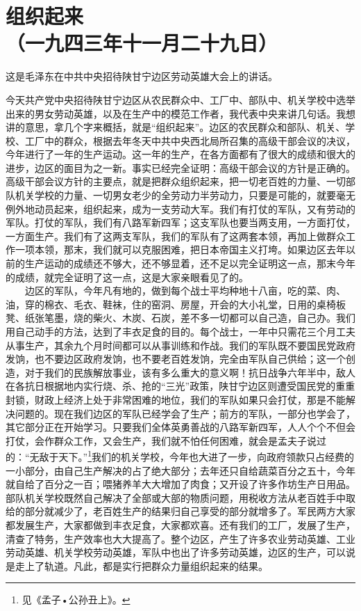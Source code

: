 \documentclass[cn,11pt,chinese]{elegantbook}
\def\myformat#1{\hfil\hfil #1}
\begin{document}
\newpage\section*{\myformat{组织起来}\\\myformat{（一九四三年十一月二十九日）}}
\begin{introduction}\item  这是毛泽东在中共中央招待陕甘宁边区劳动英雄大会上的讲话。\end{introduction}
今天共产党中央招待陕甘宁边区从农民群众中、工厂中、部队中、机关学校中选举出来的男女劳动英雄，以及在生产中的模范工作者，我代表中央来讲几句话。我想讲的意思，拿几个字来概括，就是“组织起来”。边区的农民群众和部队、机关、学校、工厂中的群众，根据去年冬天中共中央西北局所召集的高级干部会议的决议，今年进行了一年的生产运动。这一年的生产，在各方面都有了很大的成绩和很大的进步，边区的面目为之一新。事实已经完全证明：高级干部会议的方针是正确的。高级干部会议方针的主要点，就是把群众组织起来，把一切老百姓的力量、一切部队机关学校的力量、一切男女老少的全劳动力半劳动力，只要是可能的，就要毫无例外地动员起来，组织起来，成为一支劳动大军。我们有打仗的军队，又有劳动的军队。打仗的军队，我们有八路军新四军；这支军队也要当两支用，一方面打仗，一方面生产。我们有了这两支军队，我们的军队有了这两套本领，再加上做群众工作一项本领，那末，我们就可以克服困难，把日本帝国主义打垮。如果边区去年以前的生产运动的成绩还不够大，还不够显着，还不足以完全证明这一点，那末今年的成绩，就完全证明了这一点，这是大家亲眼看见了的。\\
　　边区的军队，今年凡有地的，做到每个战士平均种地十八亩，吃的菜、肉、油，穿的棉衣、毛衣、鞋袜，住的窑洞、房屋，开会的大小礼堂，日用的桌椅板凳、纸张笔墨，烧的柴火、木炭、石炭，差不多一切都可以自己造，自己办。我们用自己动手的方法，达到了丰衣足食的目的。每个战士，一年中只需花三个月工夫从事生产，其余九个月时间都可以从事训练和作战。我们的军队既不要国民党政府发饷，也不要边区政府发饷，也不要老百姓发饷，完全由军队自己供给；这一个创造，对于我们的民族解放事业，该有多么重大的意义啊！抗日战争六年半中，敌人在各抗日根据地内实行烧、杀、抢的“三光”政策，陕甘宁边区则遭受国民党的重重封锁，财政上经济上处于非常困难的地位，我们的军队如果只会打仗，那是不能解决问题的。现在我们边区的军队已经学会了生产；前方的军队，一部分也学会了，其它部分正在开始学习。只要我们全体英勇善战的八路军新四军，人人个个不但会打仗，会作群众工作，又会生产，我们就不怕任何困难，就会是孟夫子说过的：“无敌于天下。”\footnote[1]{ 见《孟子•公孙丑上》。}我们的机关学校，今年也大进了一步，向政府领款只占经费的一小部分，由自己生产解决的占了绝大部分；去年还只自给蔬菜百分之五十，今年就自给了百分之一百；喂猪养羊大大增加了肉食；又开设了许多作坊生产日用品。部队机关学校既然自己解决了全部或大部的物质问题，用税收方法从老百姓手中取给的部分就减少了，老百姓生产的结果归自己享受的部分就增多了。军民两方大家都发展生产，大家都做到丰衣足食，大家都欢喜。还有我们的工厂，发展了生产，清查了特务，生产效率也大大提高了。整个边区，产生了许多农业劳动英雄、工业劳动英雄、机关学校劳动英雄，军队中也出了许多劳动英雄，边区的生产，可以说是走上了轨道。凡此，都是实行把群众力量组织起来的结果。\\
\end{document}
